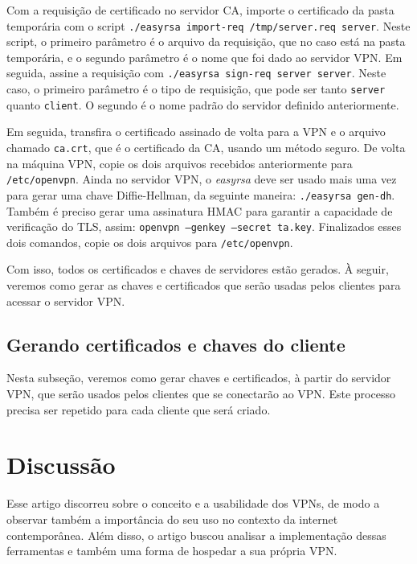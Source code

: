 \documentclass[12pt]{article}
\begin{document}
\begin{flushleft}
Com a requisição de certificado no servidor CA, importe o certificado da pasta temporária com o script 
\texttt{./easyrsa import-req /tmp/server.req server}. Neste script, o primeiro parâmetro é o arquivo da requisição,
que no caso está na pasta temporária, e o segundo parâmetro é o nome que foi dado ao servidor VPN. Em seguida,
assine a requisição com \texttt{./easyrsa sign-req server server}. Neste caso, o primeiro parâmetro é o tipo de 
requisição, que pode ser tanto \texttt{server} quanto \texttt{client}. O segundo é o nome padrão do servidor definido anteriormente.

Em seguida, transfira o certificado assinado de volta para a VPN e o arquivo chamado
\texttt{ca.crt}, que é o certificado da CA, usando um método seguro. De volta na máquina VPN, copie os dois arquivos recebidos 
anteriormente para \texttt{/etc/openvpn}. Ainda no servidor VPN, o \emph{easyrsa} deve ser usado mais uma vez para
gerar uma chave Diffie-Hellman, da seguinte maneira: \texttt{./easyrsa gen-dh}. Também é preciso gerar uma
assinatura HMAC para garantir a capacidade de verificação do TLS, assim: \texttt{openvpn --genkey --secret ta.key}.
Finalizados esses dois comandos, copie os dois arquivos para \texttt{/etc/openvpn}. 

Com isso, todos os certificados e chaves de servidores estão gerados. À seguir, veremos como gerar as chaves 
e certificados que serão usadas pelos clientes para acessar o servidor VPN.


\subsection{Gerando certificados e chaves do cliente}

Nesta subseção, veremos como gerar chaves e certificados, à partir do servidor VPN, que serão usados
pelos clientes que se conectarão ao VPN. Este processo precisa ser repetido para cada cliente que será criado.


\section{Discussão}

Esse artigo discorreu sobre o conceito e a usabilidade dos VPNs, de modo a observar também a importância
do seu uso no contexto da internet contemporânea. Além disso, o artigo buscou analisar a implementação
dessas ferramentas e também uma forma de hospedar a sua própria VPN.


\end{flushleft}
\end{document}
